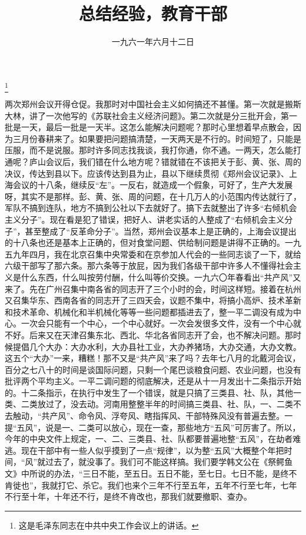 
\title{总结经验，教育干部}
\date{一九六一年六月十二日}
\thanks{这是毛泽东同志在中共中央工作会议上的讲话。}
\maketitle


两次郑州会议开得仓促。我那时对中国社会主义如何搞还不甚懂。第一次就是搬斯大林，讲了一次他写的《苏联社会主义经济问题》。第二次就是分三批开会，第一批是一天，最后一批是一天半。这怎么能解决问题呢？那时心里想着早点散会，因为三月份春耕来了。如果要把问题搞清楚，一天两天是不行的。时间短了，只能是压服，而不是说服。那时许多同志找我谈，我打你通，你不通。一两天，怎么能打通呢？庐山会议后，我们错在什么地方呢？错就错在不该把关于彭、黄、张、周的决议，传达到县以下。应该传达到县为止，县以下继续贯彻《郑州会议记录》、上海会议的十八条，继续反“左”。一反右，就造成一个假象，可好了，生产大发展呀，其实不是那样。彭、黄、张、周的问题，在十几万人的小范围内传达就行了，军队不搞到连队，地方不搞到公社以下去就好了。搞下去就整出了许多“右倾机会主义分子”。现在看是犯了错误，把好人、讲老实话的人整成了“右倾机会主义分子”，甚至整成了“反革命分子”。当然，郑州会议基本上是正确的，上海会议提出的十八条也还是基本上正确的，但对食堂问题、供给制问题是讲得不正确的。一九五九年四月，我在北京召集中央常委和在京参加人代会的一些同志谈了一下，就给六级干部写了那六条。那六条等于放屁，因为我们各级干部中许多人不懂得社会主义是什么东西，什么叫按劳付酬，什么叫等价交换。一九六〇年春看出“共产风”又来了。先在广州召集中南各省的同志开了三个小时的会，时间这样短。接着在杭州又召集华东、西南各省的同志开了三四天会，议题不集中，将搞小高炉、技术革新和技术革命、机械化和半机械化等等一些问题都插进去了，整一平二调没有成为中心。一次会只能有一个中心，一个中心就好。一次会发很多文件，没有一个中心就不好。后来又在天津召集东北、西北、华北各省同志开了会，也不解决问题。那时候提倡几个大办：大办水利，大办县社工业，大办养猪场，大办交通，大办文教。这五个“大办”一来，糟糕！那不又是“共产风”来了吗？去年七八月的北戴河会议，百分之七八十的时间是谈国际问题，只剩一个尾巴谈粮食问题、农业问题，也没有批评两个平均主义。一平二调问题的彻底解决，还是从十一月发出十二条指示开始的。十二条指示，在执行中发生了一个错误，就是只搞了三类县、社、队，其他一类、二类放过了，没去动。河南用整整半年的时间搞三类县、社、队，一、二类不去触动，“共产风”、命令风、浮夸风、瞎指挥风、干部特殊风没有普遍去整。一提“五风”，说是一、二类可以放心，现在一查，那些地方“五风”可厉害了。所以，今年的中央文件上规定，一、二、三类县、社、队都要普遍地整“五风”，在劫者难逃。现在干部中有一些人似乎摸到了一点“规律”，以为整“五风”大概整个年把时间，“风”就过去了，就没事了。我们可不能这样搞。我们要学韩文公在《祭鳄鱼文》中所说的办法，“三日不能，至五日。五日不能，至七日。七日不能，是终不肯徙也”，我就打它、杀它。我们也来个三年不行至五年，五年不行至七年，七年不行至十年，十年还不行，是终不肯改也，那我们就要撤职、查办。

